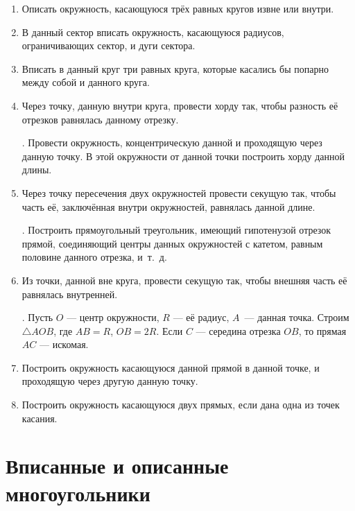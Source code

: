 \documentclass[twoside]{book}
\begin{document}
\begin{enumerate}[resume]
 \item
Описать окружность, касающуюся трёх равных кругов извне или внутри.

 \item
В данный сектор вписать окружность, касающуюся радиусов, ограничивающих сектор, и дуги сектора.

 \item
Вписать в данный круг три равных круга, которые касались бы попарно между собой и данного круга.

 \item
Через точку, данную внутри круга, провести хорду так, чтобы разность её отрезков равнялась данному отрезку.

\smallskip
{}.
Провести окружность, концентрическую данной и проходящую через данную точку.
В этой окружности от данной точки построить хорду данной длины.


 \item
Через точку пересечения двух окружностей провести секущую так, чтобы часть её, заключённая внутри окружностей, равнялась данной длине.

\smallskip
{}.
Построить прямоугольный треугольник, имеющий гипотенузой отрезок прямой, соединяющий центры данных окружностей с катетом, равным половине данного отрезка, и~т.~д.

 \item
Из точки, данной вне круга, провести секущую так, чтобы внешняя часть её равнялась внутренней.

\smallskip
{}.
Пусть $O$ — центр окружности, $R$ — её радиус, $A$~— данная точка.
Строим $\triangle AOB$, где $AB=R$, $OB=2R$.
Если $C$ — середина отрезка $OB$, то прямая $AC$ — искомая.

 \item
Построить окружность касающуюся данной прямой в данной точке, и проходящую через другую данную точку.

 \item
Построить окружность касающуюся двух прямых, если дана одна из точек касания.

\end{enumerate}

\renewcommand{\bottomtitlespace}{.2\textheight}%

\section{Вписанные и описанные многоугольники}
\end{document}
